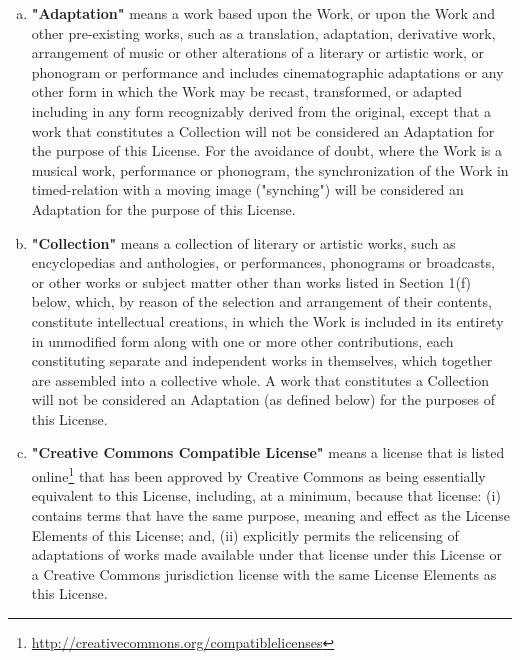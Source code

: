 \begin{enumerate}[a.]
          \item\textbf{"Adaptation"} means a work based upon
          the Work, or upon the Work and other pre-existing works,
          such as a translation, adaptation, derivative work,
          arrangement of music or other alterations of a literary
          or artistic work, or phonogram or performance and
          includes cinematographic adaptations or any other form in
          which the Work may be recast, transformed, or adapted
          including in any form recognizably derived from the
          original, except that a work that constitutes a
          Collection will not be considered an Adaptation for the
          purpose of this License. For the avoidance of doubt,
          where the Work is a musical work, performance or
          phonogram, the synchronization of the Work in
          timed-relation with a moving image ("synching") will be
          considered an Adaptation for the purpose of this
          License.

          \item\textbf{"Collection"} means a collection of
          literary or artistic works, such as encyclopedias and
          anthologies, or performances, phonograms or broadcasts,
          or other works or subject matter other than works listed
          in Section 1(f) below, which, by reason of the selection
          and arrangement of their contents, constitute
          intellectual creations, in which the Work is included in
          its entirety in unmodified form along with one or more
          other contributions, each constituting separate and
          independent works in themselves, which together are
          assembled into a collective whole. A work that
          constitutes a Collection will not be considered an
          Adaptation (as defined below) for the purposes of this
          License.

          \item\textbf{"Creative Commons Compatible
          License"} means a license that is listed online\footnote{
          \url{http://creativecommons.org/compatiblelicenses}} that has
          been approved by Creative Commons as being essentially
          equivalent to this License, including, at a minimum,
          because that license: (i) contains terms that have the
          same purpose, meaning and effect as the License Elements
          of this License; and, (ii) explicitly permits the
          relicensing of adaptations of works made available under
          that license under this License or a Creative Commons
          jurisdiction license with the same License Elements as
          this License.


\end{enumerate}
